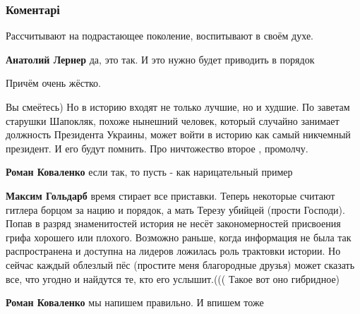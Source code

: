  
 
 
 
 
\subsubsection{Коментарі}

\begin{itemize} %
Рассчитывают на подрастающее поколение, воспитывают в своём духе.

\begin{itemize} %
\textbf{Анатолий Лернер} да, это так. И это нужно будет приводить в порядок

Причём очень жёстко.
\end{itemize} %


Вы смеётесь) Но в историю входят не только лучшие, но и худшие.
По заветам старушки Шапокляк, похоже нынешний человек, который случайно занимает должность Президента Украины, может войти в историю как самый никчемный президент. И его будут помнить.
Про ничтожество второе , промолчу.

\begin{itemize} %
\textbf{Роман Коваленко} если так, то пусть - как нарицательный пример

\textbf{Максим Гольдарб} время стирает все приставки. Теперь некоторые считают гитлера борцом за нацию и порядок, а мать Терезу убийцей (прости Господи).
Попав в разряд знаменитостей история не несёт закономерностей присвоения грифа хорошего или плохого.
Возможно раньше, когда информация не была так распространена и доступна на лидеров ложилась роль трактовки истории. Но сейчас каждый облезлый пёс (простите меня благородные друзья) может сказать все, что угодно и найдутся те, кто его услышит.(((
Такое вот оно гибридное)

\textbf{Роман Коваленко} мы напишем правильно. И впишем тоже
\end{itemize} %



\end{itemize}

